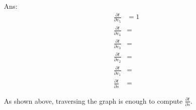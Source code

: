 \documentclass[10pt,letter,notitlepage]{article}
\newcommand{\ans}[1]{{\color{blue}\textsf{Ans}: #1}}
\begin{document}
\begin{exercise}
\begin{enumerate}
			\ans{\vskip1cm
			\begin{align}
			\frac{\partial t}{\partial v_{5}} & = 1 \\
			\frac{\partial t}{\partial v_{4}} & =  \\
			\frac{\partial t}{\partial v_{3}} & =  \\
			\frac{\partial t}{\partial v_{2}} & =  \\
			\frac{\partial t}{\partial v_{1}} & =  \\								
			\frac{\partial t}{\partial s} & =  
			\end{align}
			
			As shown above, traversing the graph \qquad\qquad is enough to compute $\frac{\partial t}{\partial s}$.
			}
				
		\end{enumerate}
	
	\end{exercise}
	 
\end{document}
